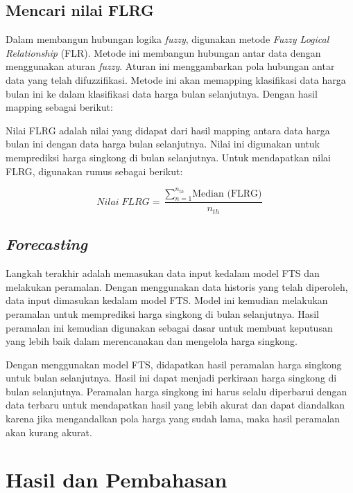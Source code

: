 \documentclass[conference]{IEEEtran}
\begin{document}
\subsection{Mencari nilai FLRG}
Dalam membangun hubungan logika \textit{fuzzy}, digunakan metode \textit{Fuzzy Logical Relationship} (FLR). Metode ini membangun hubungan antar data dengan menggunakan aturan \textit{fuzzy}. Aturan ini menggambarkan pola hubungan antar data yang telah difuzzifikasi. Metode ini akan memapping klasifikasi data harga bulan ini ke dalam klasifikasi data harga bulan selanjutnya. Dengan hasil mapping sebagai berikut:

Nilai FLRG adalah nilai yang didapat dari hasil mapping antara data harga bulan ini dengan data harga bulan selanjutnya. Nilai ini digunakan untuk memprediksi harga singkong di bulan selanjutnya.
Untuk mendapatkan nilai FLRG, digunakan rumus sebagai berikut:
    
\begin{equation}
        Nilai\; FLRG = \frac{\sum_{n=1}^{n_{th}} \text{Median (FLRG)}}{n_{th}}
    \end{equation}
    
\subsection{\textit{Forecasting}}
Langkah terakhir adalah memasukan data input kedalam model FTS dan melakukan peramalan. Dengan menggunakan data historis yang telah diperoleh, data input dimasukan kedalam model FTS. Model ini kemudian melakukan peramalan untuk memprediksi harga singkong di bulan selanjutnya. Hasil peramalan ini kemudian digunakan sebagai dasar untuk membuat keputusan yang lebih baik dalam merencanakan dan mengelola harga singkong. 

Dengan menggunakan model FTS, didapatkan hasil peramalan harga singkong untuk bulan selanjutnya. Hasil ini dapat menjadi perkiraan harga singkong di bulan selanjutnya. Peramalan harga singkong ini harus selalu diperbarui dengan data terbaru untuk mendapatkan hasil yang lebih akurat dan dapat diandalkan karena jika mengandalkan pola harga yang sudah lama, maka hasil peramalan akan kurang akurat.


\section{Hasil dan Pembahasan}
\end{document}
